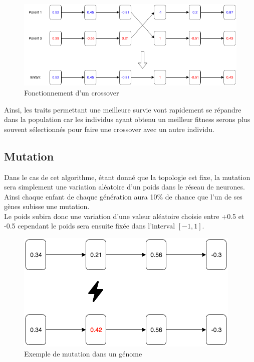 \documentclass{article}
\begin{document}
\begin{figure}[h]
\begin{center}
	\includegraphics[scale=0.6]{"crossover.png"} 
	\caption{Fonctionnement d'un crossover}
\end{center}
\end{figure}
\newpage

Ainsi, les traits permettant une meilleure survie vont rapidement se répandre dans la population car les individus ayant obtenu un meilleur fitness serons plus souvent sélectionnés pour faire une crossover avec un autre individu.

\subsection{Mutation}

Dans le cas de cet algorithme, étant donné que la topologie est fixe, la mutation sera simplement une variation aléatoire d'un poids dans le réseau de neurones. Ainsi chaque enfant de chaque génération aura 10\% de chance que l'un de ses gènes subisse une mutation.\\
Le poids subira donc une variation d'une valeur aléatoire choisie entre +0.5 et -0.5 cependant le poids sera ensuite fixée dans l'interval $[-1, 1]$.

\begin{figure}[h]
\begin{center}
	\includegraphics[scale=0.6]{mutation.png}
	\caption{Exemple de mutation dans un génome}
\end{center}
\end{figure}
\newpage
\end{document}
